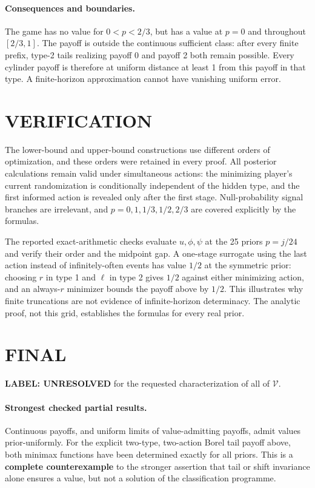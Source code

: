 \documentclass[11pt,a4paper]{article}
\theoremstyle{definition}
\theoremstyle{remark}
\begin{document}
\paragraph{Consequences and boundaries.}
The game has no value for $0<p<2/3$, but has a value at $p=0$ and throughout $[2/3,1]$. The payoff is outside the continuous sufficient class: after every finite prefix, type-2 tails realizing payoff 0 and payoff 2 both remain possible. Every cylinder payoff is therefore at uniform distance at least 1 from this payoff in that type. A finite-horizon approximation cannot have vanishing uniform error.

\section{VERIFICATION}
The lower-bound and upper-bound constructions use different orders of optimization, and these orders were retained in every proof. All posterior calculations remain valid under simultaneous actions: the minimizing player's current randomization is conditionally independent of the hidden type, and the first informed action is revealed only after the first stage. Null-probability signal branches are irrelevant, and $p=0,1,1/3,1/2,2/3$ are covered explicitly by the formulas.

The reported exact-arithmetic checks evaluate $u,\phi,\psi$ at the 25 priors $p=j/24$ and verify their order and the midpoint gap. A one-stage surrogate using the last action instead of infinitely-often events has value $1/2$ at the symmetric prior: choosing $r$ in type 1 and $\ell$ in type 2 gives $1/2$ against either minimizing action, and an always-$r$ minimizer bounds the payoff above by $1/2$. This illustrates why finite truncations are not evidence of infinite-horizon determinacy. The analytic proof, not this grid, establishes the formulas for every real prior.

\section{FINAL}
\textbf{LABEL: UNRESOLVED} for the requested characterization of all of $\mathcal V$.

\paragraph{Strongest checked partial results.}
Continuous payoffs, and uniform limits of value-admitting payoffs, admit values prior-uniformly. For the explicit two-type, two-action Borel tail payoff above, both minimax functions have been determined exactly for all priors. This is a \textbf{complete counterexample} to the stronger assertion that tail or shift invariance alone ensures a value, but not a solution of the classification programme.
\end{document}
